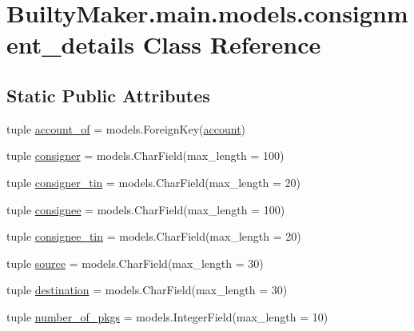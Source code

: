 \hypertarget{classBuiltyMaker_1_1main_1_1models_1_1consignment__details}{\section{\-Builty\-Maker.\-main.\-models.\-consignment\-\_\-details \-Class \-Reference}
\label{classBuiltyMaker_1_1main_1_1models_1_1consignment__details}
}
\subsection*{\-Static \-Public \-Attributes}
\begin{DoxyCompactItemize}
\item 
tuple \hyperlink{classBuiltyMaker_1_1main_1_1models_1_1consignment__details_a836e713d3be57d2a36dde43af620cf79}{account\-\_\-of} = models.\-Foreign\-Key(\hyperlink{classBuiltyMaker_1_1main_1_1models_1_1account}{account})
\item 
tuple \hyperlink{classBuiltyMaker_1_1main_1_1models_1_1consignment__details_abb946a891b10bb6a745c6a8a5198643e}{consigner} = models.\-Char\-Field(max\-\_\-length = 100)
\item 
tuple \hyperlink{classBuiltyMaker_1_1main_1_1models_1_1consignment__details_aca0fbcb3105b4042753b278aa66c43f0}{consigner\-\_\-tin} = models.\-Char\-Field(max\-\_\-length = 20)
\item 
tuple \hyperlink{classBuiltyMaker_1_1main_1_1models_1_1consignment__details_ad76b21f6dd24ac52f32e0385d305f76e}{consignee} = models.\-Char\-Field(max\-\_\-length = 100)
\item 
tuple \hyperlink{classBuiltyMaker_1_1main_1_1models_1_1consignment__details_ace108159717cbbe73325079d33739941}{consignee\-\_\-tin} = models.\-Char\-Field(max\-\_\-length = 20)
\item 
tuple \hyperlink{classBuiltyMaker_1_1main_1_1models_1_1consignment__details_a7b75b8a9f2cf74bc0e4f1e07c6b9307b}{source} = models.\-Char\-Field(max\-\_\-length = 30)
\item 
tuple \hyperlink{classBuiltyMaker_1_1main_1_1models_1_1consignment__details_a31b1ba1d6542618893fa90bdebc38b05}{destination} = models.\-Char\-Field(max\-\_\-length = 30)
\item 
tuple \hyperlink{classBuiltyMaker_1_1main_1_1models_1_1consignment__details_ab853f7c1e87ee2cdae5f92f9b50fc12f}{number\-\_\-of\-\_\-pkgs} = models.\-Integer\-Field(max\-\_\-length = 10)
\item 

\end{DoxyCompactItemize}
